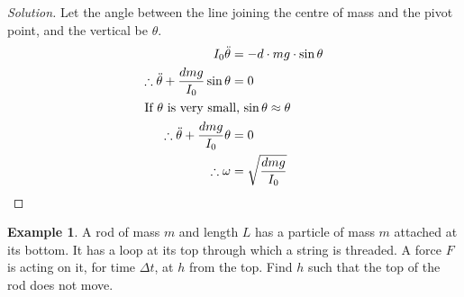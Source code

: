 \documentclass[fleqn, a4paper, 12pt]{article}
\theoremstyle{definition}
\newtheorem{example}{Example}
\theoremstyle{theorem}
\newenvironment{solution}
{\begin{proof}[Solution]\let\qed\relax}
	{\end{proof}}
\begin{document}
\begin{solution}
	Let the angle between the line joining the centre of mass and the pivot point, and the vertical be $\theta$.
	\begin{align*}
		I_0 \ddot{\theta} &= - d \cdot m g \cdot \sin \theta\\
		\therefore \ddot{\theta} + \dfrac{d m g}{I_0} \sin \theta &= 0\\
		\intertext{If $\theta$ is very small, $\sin \theta \approx \theta$}
		\therefore \ddot{\theta} + \dfrac{d m g}{I_0} \theta &= 0\\
		\therefore \omega &= \sqrt{\dfrac{d m g}{I_0}}
	\end{align*}
\end{solution}

\begin{example}
	A rod of mass $m$ and length $L$ has a particle of mass $m$ attached at its bottom. It has a loop at its top through which a string is threaded. A force $F$ is acting on it, for time $\Delta t$, at $h$ from the top. Find $h$ such that the top of the rod does not move.\\
\end{example}
\end{document}
